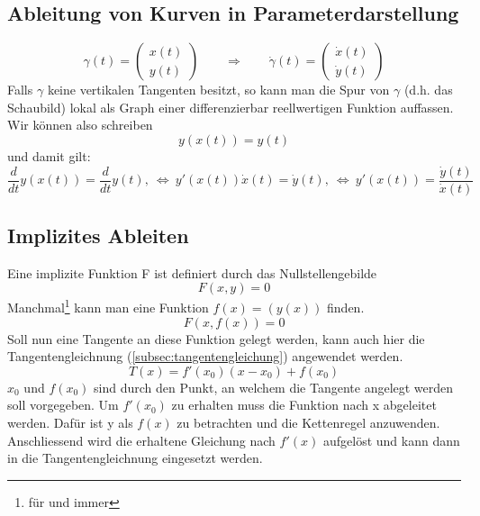 \subsection{Ableitung von Kurven in Parameterdarstellung}\label{subsec:ableitungsregeln}
\[ \boxed{\gamma(t) = \left(\begin{matrix}x(t)\\y(t)\end{matrix}\right) \qquad \Rightarrow \qquad \dot{\gamma}(t) = \left(\begin{matrix}\dot{x}(t)\\\dot{y}(t)\end{matrix}\right)} \]
Falls $\gamma$ keine vertikalen Tangenten besitzt, so kann man die Spur von $\gamma$ (d.h. das Schaubild) lokal als Graph einer differenzierbar reellwertigen Funktion auffassen. Wir können also schreiben 
\[ y(x(t)) = y(t) \]
und damit gilt: 
\[ \frac{d}{dt}y(x(t)) = \frac{d}{dt}y(t), ~\Leftrightarrow~ y'(x(t)) \dot{x}(t) = \dot{y}(t), ~\Leftrightarrow~ y'(x(t)) = \frac{\dot{y}(t)}{\dot{x}(t)} \]



\subsection{Implizites Ableiten}
Eine implizite Funktion F ist definiert durch das Nullstellengebilde 
\[ F(x,y) = 0 \]
Manchmal\footnote{für und immer} kann man eine Funktion $f(x) = (y(x))$ finden. 
\[ F(x, f(x)) = 0 \]
Soll nun eine Tangente an diese Funktion gelegt werden, kann auch hier die Tangentengleichnung (\ref{subsec:tangentengleichung}) angewendet werden. 
\[ T(x) = f'(x_0)(x - x_0) + f(x_0) \]
$x_0$ und $f(x_0)$ sind durch den Punkt, an welchem die Tangente angelegt werden soll vorgegeben. Um $f'(x_0)$ zu erhalten muss die Funktion nach x abgeleitet werden. Dafür ist y als $f(x)$ zu betrachten und die Kettenregel anzuwenden. Anschliessend wird die erhaltene Gleichung nach $f'(x)$ aufgelöst und kann dann in die Tangentengleichnung eingesetzt werden. 

